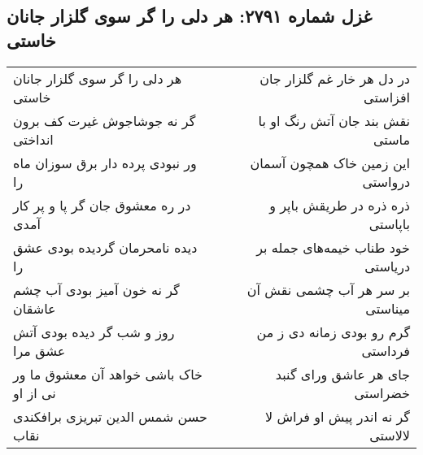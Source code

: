 \begin{center}
\section*{غزل شماره ۲۷۹۱: هر دلی را گر سوی گلزار جانان خاستی}
\label{sec:2791}
\begin{longtable}{l p{0.5cm} r}
هر دلی را گر سوی گلزار جانان خاستی
&&
در دل هر خار غم گلزار جان افزاستی
\\
گر نه جوشاجوش غیرت کف برون انداختی
&&
نقش بند جان آتش رنگ او با ماستی
\\
ور نبودی پرده دار برق سوزان ماه را
&&
این زمین خاک همچون آسمان درواستی
\\
در ره معشوق جان گر پا و پر کار آمدی
&&
ذره ذره در طریقش باپر و باپاستی
\\
دیده نامحرمان گردیده بودی عشق را
&&
خود طناب خیمه‌های جمله بر دریاستی
\\
گر نه خون آمیز بودی آب چشم عاشقان
&&
بر سر هر آب چشمی نقش آن میناستی
\\
روز و شب گر دیده بودی آتش عشق مرا
&&
گرم رو بودی زمانه دی ز من فرداستی
\\
خاک باشی خواهد آن معشوق ما ور نی از او
&&
جای هر عاشق ورای گنبد خضراستی
\\
حسن شمس الدین تبریزی برافکندی نقاب
&&
گر نه اندر پیش او فراش لا لالاستی
\\
\end{longtable}
\end{center}
